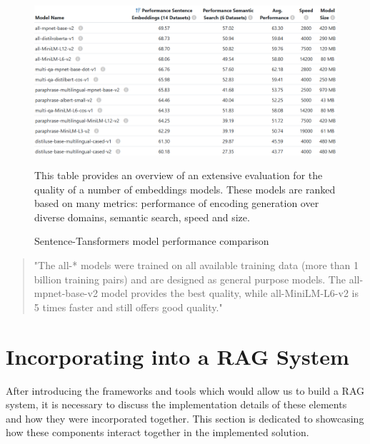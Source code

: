 \begin{figure}[H]
    \centering
    \includegraphics[width=\linewidth]{./figures/embedding-modes-performance.png}
    \caption{Sentence-Tansformers model performance comparison \cite{sbertsentencetrans}}
    \begin{flushleft}
        This table provides an overview of an extensive evaluation for the quality of a number of embeddings models. These models are ranked based on many metrics: performance of encoding generation over diverse domains, semantic search, speed and size.
    \end{flushleft}
\end{figure}
\begin{quote}
    "The all-* models were trained on all available training data (more than 1 billion training pairs) and are designed as general purpose models. The all-mpnet-base-v2 model provides the best quality, while all-MiniLM-L6-v2 is 5 times faster and still offers good quality."  \cite{sbertsentencetrans}
\end{quote}

\section{Incorporating into a RAG System}
After introducing the frameworks and tools which would allow us to build a RAG system, it is necessary to discuss the implementation details of these elements and how they were incorporated together.\newline
This section is dedicated to showcasing how these components interact together in the implemented solution.

